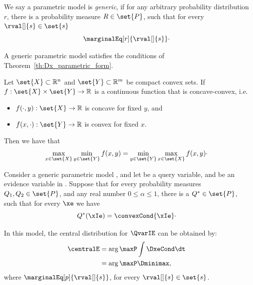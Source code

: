 \begin{definition}
    We say a parametric model \pmodel is \emph{generic}, if for any arbitrary probability distribution $r$,
    there is a probability measure $R \in \set{P}$, such that for every $\rval[]{s} \in \set{s}$
    \[
        \marginalEq[r]{\rval[]{s}}\cdot
    \]
\end{definition}

\begin{proposition}
    A generic parametric model satisfies the conditions of Theorem~\ref{th:Dx_parametric_form}.
\end{proposition}

\begin{theorem}
    \label{th:minimax}
    Let $\set{X} \subset \mathbb {R}^{n}$ and $\set{Y} \subset \mathbb {R}^{m}$ be compact convex sets.
    If $f:\set{X}\times \set{Y}\rightarrow \mathbb {R}$ is a continuous function that is concave-convex, i.e.

    \begin{itemize}
        \item $f(\cdot ,y):\set{X}\to \mathbb {R}$ is concave for fixed $y$, and
        \item $f(x,\cdot ):\set{Y}\to \mathbb {R}$ is convex for fixed $x$.
    \end{itemize}
    Then we have that
    \begin{equation}
        \max_{x\in \set{X}}\min_{y\in \set{Y}}f(x, y) = \min_{y\in \set{Y}}\max_{x\in \set{X}}f(x,y)\cdot
        \label{eq:minimax}
    \end{equation}
\end{theorem}


\begin{theorem}
    \label{th:central_by_max}
    Consider a generic parametric model \pmodel, and let \Qvar be a query variable, and \Evar be an evidence
    variable in \Mt.
    Suppose that for every probability measures $Q_1, Q_2 \in \set{P}$, and any real number $0 \leq \alpha \leq 1$,
    there is a $Q^* \in \set{P}$, such that for every $\xe$ we have
    \begin{equation}
        Q^*(\xIe) = \convexCond{\xIe}\cdot
        \label{eq:convex_dist_set}
    \end{equation}

    In this model, the central distribution for $\QvarIE$ can be obtained by:
    \begin{align}
        \centralE &= \arg\maxP \int \DxeCond \dt\\
        &= \arg\maxP \Dminimax,
        \label{eq:Cx_by_max}
    \end{align}
    where $\marginalEq[p]{\rval[]{s}}$, for every $\rval[]{s} \in \set{s}$.
\end{theorem}

